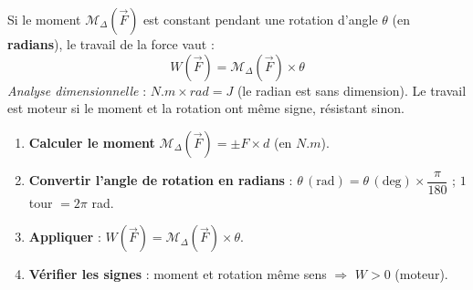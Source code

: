 \documentclass[11pt]{article}
\begin{document}
\begin{propriete}
Si le moment $\mathcal{M}_{\Delta}(\vec{F})$ est constant pendant une rotation d'angle $\theta$ (en \textbf{radians}), le travail de la force vaut :
\[ W(\vec{F}) = \mathcal{M}_{\Delta}(\vec{F}) \times \theta \]
\emph{Analyse dimensionnelle} : $\si{N.m} \times \si{rad} = \si{J}$ (le radian est sans dimension).
Le travail est moteur si le moment et la rotation ont même signe, résistant sinon.
\end{propriete}

\begin{methode}
\begin{enumerate}
\item \textbf{Calculer le moment} $\mathcal{M}_{\Delta}(\vec{F}) = \pm F \times d$ (en $\si{N.m}$).
\item \textbf{Convertir l'angle de rotation en radians} : $\theta\,(\text{rad}) = \theta\,(\text{deg}) \times \dfrac{\pi}{180}$ ; $1$ tour $= 2\pi$ rad.
\item \textbf{Appliquer} : $W(\vec{F}) = \mathcal{M}_{\Delta}(\vec{F}) \times \theta$.
\item \textbf{Vérifier les signes} : moment et rotation même sens $\Rightarrow$ $W>0$ (moteur).
\end{enumerate}
\end{methode}
\end{document}
